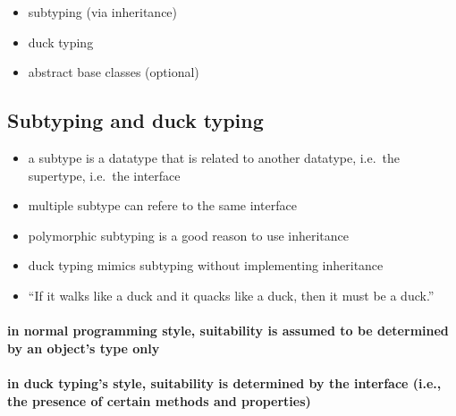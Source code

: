 \documentclass[11pt]{article}
\providecommand{\tightlist}{%
      \setlength{\itemsep}{0pt}\setlength{\parskip}{0pt}}
\begin{document}
\begin{itemize}
\tightlist
\item
  subtyping (via inheritance)
\item
  duck typing
\item
  abstract base classes (optional)
\end{itemize}

    \hypertarget{subtyping-and-duck-typing}{%
\subsection{Subtyping and duck typing}\label{subtyping-and-duck-typing}}

\begin{itemize}
\tightlist
\item
  a subtype is a datatype that is related to another datatype, i.e.~the
  supertype, i.e.~the interface
\item
  multiple subtype can refere to the same interface
\item
  polymorphic subtyping is a good reason to use inheritance
\item
  duck typing mimics subtyping without implementing inheritance
\item
  ``If it walks like a duck and it quacks like a duck, then it must be a
  duck.''
\end{itemize}

\hypertarget{in-normal-programming-style-suitability-is-assumed-to-be-determined-by-an-objects-type-only}{%
\paragraph{in normal programming style, suitability is assumed to be
determined by an object's type
only}\label{in-normal-programming-style-suitability-is-assumed-to-be-determined-by-an-objects-type-only}}

\hypertarget{in-duck-typings-style-suitability-is-determined-by-the-interface-i.e.-the-presence-of-certain-methods-and-properties}{%
\paragraph{in duck typing's style, suitability is determined by the
interface (i.e., the presence of certain methods and
properties)}\label{in-duck-typings-style-suitability-is-determined-by-the-interface-i.e.-the-presence-of-certain-methods-and-properties}}
\end{document}
